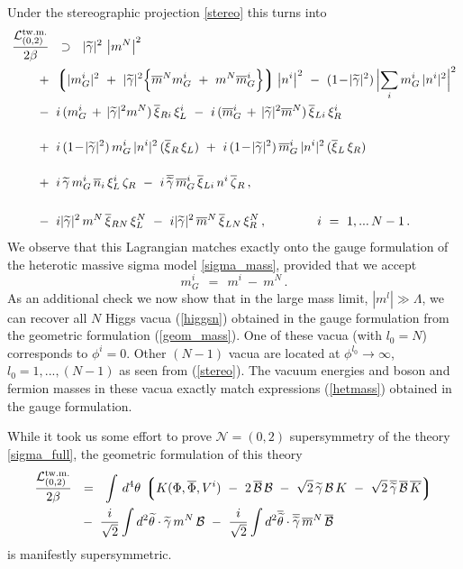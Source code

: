 \documentclass[12pt]{article}
\newcommand{\ntwoo}{${\mathcal N}= \left(0,2\right) $ }
\newcommand{\wt}{\widetilde}
\newcommand{\ov}{\overline}
\newcommand{\mc}[1]{\mathcal{#1}}
\newcommand{\lgr}{\left\lgroup}
\newcommand{\rgr}{\right\rgroup}
\newcommand{\bxir}{\ov{\xi}{}_R}
\newcommand{\bxil}{\ov{\xi}{}_L}
\newcommand{\xir}{\xi_R}
\newcommand{\xil}{\xi_L}
\newcommand{\bzr}{\ov{\zeta}{}_R}
\newcommand{\zr}{\zeta_R}
\newcommand{\tgamma}{\wt{\gamma}}
\newcommand{\btgamma}{\ov{\tgamma}}
\newcommand{\bxi}{\ov{\xi}{}}
\begin{document}
Under the stereographic projection \eqref{stereo} this turns into
\begin{align*}
%
	\frac{\mc{L}_{(0,2)}^\text{tw.m.}}{2\beta} & 
	~~\supset~~ 
	|\tgamma|^2\, \left|m^N\right|^2 
	\\
%
	&\!\!\!\!\!\!\!\!
	~+~
	\lgr |m_G^i|^2 ~+~
		|\tgamma|^2 \Bigl\{ \ov{m}{}^N m_G^i ~+~ m^N \ov{m}{}_G^i \Bigr\} \rgr \left|n^i \right|^2 
	~-~ (1 \!-\! |\tgamma|^2)\, \Bigl| \sum_i m_G^i\, |n^i|^2 \Bigr|^2 
	\\
%
	&\!\!\!\!\!\!\!\!
	~-~ i\, ( m_G^i \,+\, |\tgamma|^2 m^N )\, \bxi_{Ri}\, \xi_L^i
	~-~ i\, (\ov{m}{}_G^i \,+\, |\tgamma|^2 \ov{m}{}^N )\, \bxi_{Li}\, \xi_R^i
	\\[4mm]
%
	&\!\!\!\!\!\!\!\!
	~+~ i\,(1\!-\!|\tgamma|^2)\, m_G^i\,|n^i|^2\, (\bxir\,\xil) 
	~+~ i\,(1\!-\!|\tgamma|^2)\, \ov{m}{}_G^i\,|n^i|^2\, (\bxil\,\xir)
	\\[4mm]
%
	&\!\!\!\!\!\!\!\!
	~+~ i\,\tgamma\, m_G^i\,\ov{n}{}_i\, \xi_L^i\, \zr
	~-~ i\,\btgamma\, \ov{m}{}_G^i\, \bxi_{Li}\, n^i\, \bzr\,,
	\\[5mm]
%
	&\!\!\!\!\!\!\!\!
	~-~ i |\tgamma|^2\, m^N\, \ov{\xi}{}_{RN}\, \xi_L^N
	~-~ i |\tgamma|^2\, \ov{m}^N\, \ov{\xi}{}_{LN}\, \xi_R^N\,,
	\qquad\qquad
	i ~=~ 1,...\,N-1\,.
\end{align*}
	We observe that this Lagrangian matches exactly
	onto the gauge formulation of the heterotic massive sigma model \eqref{sigma_mass}, provided that
	we accept
\[
	m_G^i ~~=~~ m^i ~-~ m^N \,.
\]
As an additional check we now show that in the 
large  mass limit, $|m^l|\gg \Lambda$, we can
recover all $N$ Higgs vacua (\ref{higgsn}) obtained in the
gauge formulation from the geometric formulation (\ref{geom_mass}). One of these vacua (with $l_0=N$) corresponds
to $\phi^i=0$. Other $(N-1)$ vacua are located at $\phi^{l_0}\to\infty$, $l_0=1,...,(N-1)$ as  seen from 
(\ref{stereo}). The vacuum energies and boson and fermion masses 
in these vacua exactly match expressions (\ref{hetmass})
obtained in the gauge formulation.

	While it took us some effort to prove \ntwoo supersymmetry of the theory \eqref{sigma_full},
	the geometric formulation of this theory 
\begin{align*}
	\frac{\mc{L}_{(0,2) }^\text{tw.m.}}{2\beta} & 
	~~=~~ \int\, d^4\theta\, \lgr K(\Phi,\ov{\Phi}, V^i) 
		~-~ 2\, \ov{\mc{B}}\,\mc{B}  
		~-~  \sqrt{2}\, \tgamma\,\mc{B}\,K  ~-~ \sqrt{2}\, \ov{\tgamma}\,\ov{\mc{B}}\,\ov{K} \rgr
	\\
%
	&~
	~-~ \frac{i}{\sqrt{2}} \int d^2\wt{\theta} \cdot \tgamma\,m^N\,\mc{B} 
	~-~ \frac{i}{\sqrt{2}} \int d^2\ov{\wt{\theta}} \cdot \btgamma\, \ov{m}{}^N\, \ov{\mc{B}}
\end{align*}
	is manifestly supersymmetric.
	
\end{document}
